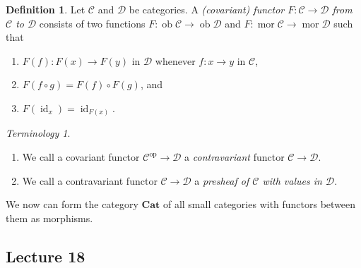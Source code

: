 \documentclass[10pt,letterpaper,cm]{nupset}
\theoremstyle{definition}
\newtheorem{definition}{Definition}[subsection]
\theoremstyle{theorem}
\theoremstyle{remark}
\newtheorem*{term}{Terminology}
\newcommand{\1}{\mathbf{1}}
\renewcommand{\c}{\mathscr{C}}
\renewcommand{\d}{\mathscr{D}}
\newcommand{\0}{\vec 0}
\DeclareMathOperator{\id}{\mathrm{id}}
\DeclareMathOperator{\op}{op}
\DeclareMathOperator{\mor}{mor}
\DeclareMathOperator{\ob}{ob}
\begin{document}
\begin{definition}\label{funct}
Let $\c$ and $\d$ be categories. A \textit{(covariant) functor $F: \c \to \d$ from $\c$ to $\d$} consists of two functions $F: \ob{\c} \to \ob{\d}$ and $F: \mor{\c} \to \mor{\d}$ such that 
\begin{enumerate}[label=(\roman*)]
\item $F(f) : F(x) \to F(y)$ in $\d$ whenever $f: x \to y$ in $\c$,
\item $F(f \circ g) = F(f) \circ F(g)$, and 
\item $F(\id_x) = \id_{F(x)}$.
\end{enumerate}
\end{definition}

\begin{term} $ $
\begin{enumerate}
\item We call  a covariant functor  $\c^{\op} \to \d$ a \textit{contravariant} functor $\c \to \d$.
\item We call a contravariant functor $\c \to \d$ a \textit{presheaf of $\c$ with values in $\d$}.
\end{enumerate}
\end{term}

\smallskip

We now can form the category $\mathbf{Cat}$ of all small categories with functors between them as morphisms.

\subsection{Lecture 18}
\end{document}
